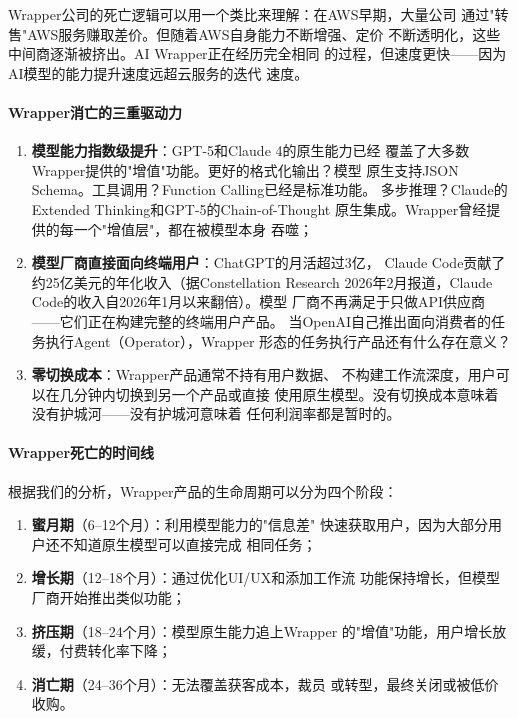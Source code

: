 Wrapper公司的死亡逻辑可以用一个类比来理解：在AWS早期，大量公司
通过"转售"AWS服务赚取差价。但随着AWS自身能力不断增强、定价
不断透明化，这些中间商逐渐被挤出。AI Wrapper正在经历完全相同
的过程，但速度更快——因为AI模型的能力提升速度远超云服务的迭代
速度。

\paragraph{Wrapper消亡的三重驱动力}

\begin{enumerate}
  \item \textbf{模型能力指数级提升}：GPT-5和Claude 4的原生能力已经
    覆盖了大多数Wrapper提供的"增值"功能。更好的格式化输出？模型
    原生支持JSON Schema。工具调用？Function Calling已经是标准功能。
    多步推理？Claude的Extended Thinking和GPT-5的Chain-of-Thought
    原生集成。Wrapper曾经提供的每一个"增值层"，都在被模型本身
    吞噬；

  \item \textbf{模型厂商直接面向终端用户}：ChatGPT的月活超过3亿，
    Claude Code贡献了约25亿美元的年化收入（据Constellation Research
    2026年2月报道，Claude Code的收入自2026年1月以来翻倍）。模型
    厂商不再满足于只做API供应商——它们正在构建完整的终端用户产品。
    当OpenAI自己推出面向消费者的任务执行Agent（Operator），Wrapper
    形态的任务执行产品还有什么存在意义？

  \item \textbf{零切换成本}：Wrapper产品通常不持有用户数据、
    不构建工作流深度，用户可以在几分钟内切换到另一个产品或直接
    使用原生模型。没有切换成本意味着没有护城河——没有护城河意味着
    任何利润率都是暂时的。
\end{enumerate}

\paragraph{Wrapper死亡的时间线}
根据我们的分析，Wrapper产品的生命周期可以分为四个阶段：

\begin{enumerate}
  \item \textbf{蜜月期}（6--12个月）：利用模型能力的"信息差"
    快速获取用户，因为大部分用户还不知道原生模型可以直接完成
    相同任务；
  \item \textbf{增长期}（12--18个月）：通过优化UI/UX和添加工作流
    功能保持增长，但模型厂商开始推出类似功能；
  \item \textbf{挤压期}（18--24个月）：模型原生能力追上Wrapper
    的"增值"功能，用户增长放缓，付费转化率下降；
  \item \textbf{消亡期}（24--36个月）：无法覆盖获客成本，裁员
    或转型，最终关闭或被低价收购。
\end{enumerate}

